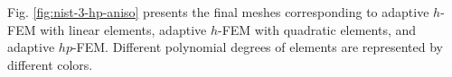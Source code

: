 \documentclass[12pt]{elsarticle}
\begin{document}

Fig. \ref{fig:nist-3-hp-aniso} presents the final meshes corresponding to adaptive $h$-FEM with 
linear elements, adaptive $h$-FEM with quadratic elements, and adaptive $hp$-FEM. Different 
polynomial degrees of elements are represented by different colors. 
\end{document}
